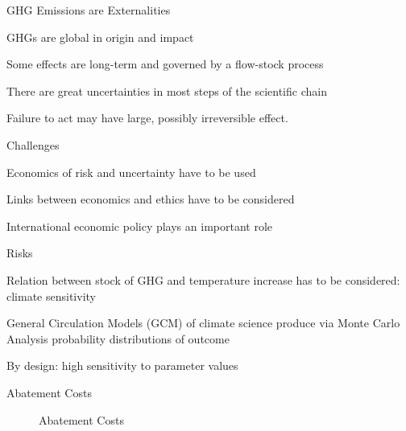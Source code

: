{GHG Emissions are Externalities}






	GHGs are global in origin and impact

	Some effects are long-term and governed by a flow-stock process

	There are great uncertainties in most steps of the scientific chain

	Failure to act may have large, possibly irreversible effect.






{Challenges}






	Economics of risk and uncertainty have to be used

	Links between economics and ethics have to be considered

	International economic policy plays an important role







{Risks}






	Relation between stock of GHG and temperature increase has to be considered: climate sensitivity

	General Circulation Models (GCM) of climate science produce via Monte Carlo Analysis probability distributions of outcome

	By design: high sensitivity to parameter values






{Abatement Costs}
\begin{center}
\begin{figure}[h!]
\centering
{} %
\caption{Abatement Costs}
\label{fig:abatement}
\end{figure}
\end{center}

